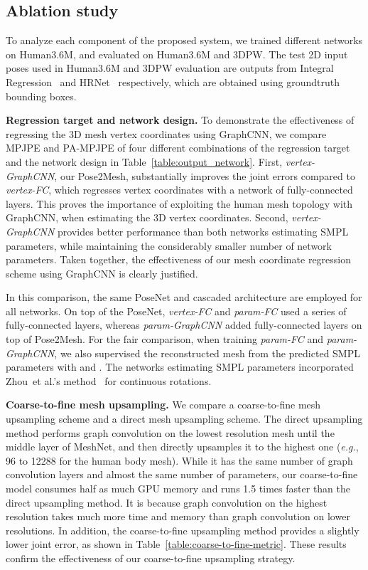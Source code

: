 \documentclass[runningheads]{llncs}
\begin{document}
\subsection{Ablation study}
To analyze each component of the proposed system, we trained different networks on Human3.6M, and evaluated on Human3.6M and 3DPW.
The test 2D input poses used in Human3.6M and 3DPW evaluation are outputs from Integral Regression~\cite{sun2018integral} and HRNet~\cite{sun2019deep} respectively, which are obtained using groundtruth bounding boxes.


\noindent\textbf{Regression target and network design.}
To demonstrate the effectiveness of regressing the 3D mesh vertex coordinates using GraphCNN, we compare MPJPE and PA-MPJPE of four different combinations of the regression target and the network design in Table~\ref{table:output_network}.
First, \textit{vertex-GraphCNN}, our Pose2Mesh, substantially improves the joint errors compared to \textit{vertex-FC}, which regresses vertex coordinates with a network of fully-connected layers.
This proves the importance of exploiting the human mesh topology with GraphCNN, when estimating the 3D vertex coordinates.
Second, \textit{vertex-GraphCNN} provides better performance than both networks estimating SMPL parameters, while maintaining the considerably smaller number of network parameters.
Taken together, the effectiveness of our mesh coordinate regression scheme using GraphCNN is clearly justified.

In this comparison, the same PoseNet and cascaded architecture are employed for all networks.
On top of the PoseNet, \textit{vertex-FC} and \textit{param-FC} used a series of fully-connected layers, whereas \textit{param-GraphCNN} added fully-connected layers on top of Pose2Mesh.
For the fair comparison, when training \textit{param-FC} and \textit{param-GraphCNN}, we also supervised the reconstructed mesh from the predicted SMPL parameters with  and .
The networks estimating SMPL parameters incorporated Zhou~et al.'s method~\cite{zhou2019continuity} for continuous rotations.

\noindent\textbf{Coarse-to-fine mesh upsampling.}
We compare a coarse-to-fine mesh upsampling scheme and a direct mesh upsampling scheme.
The direct upsampling method performs graph convolution on the lowest resolution mesh until the middle layer of MeshNet, and then directly upsamples it to the highest one (\textit{e.g.}, 96 to 12288 for the human body mesh).
While it has the same number of graph convolution layers and almost the same number of parameters, our coarse-to-fine model consumes half as much GPU memory and runs 1.5 times faster than the direct upsampling method.
It is because graph convolution on the highest resolution takes much more time and memory than graph convolution on lower resolutions.
In addition, the coarse-to-fine upsampling method provides a slightly lower joint error, as shown in Table~\ref{table:coarse-to-fine-metric}.
These results confirm the effectiveness of our coarse-to-fine upsampling strategy.
\end{document}
